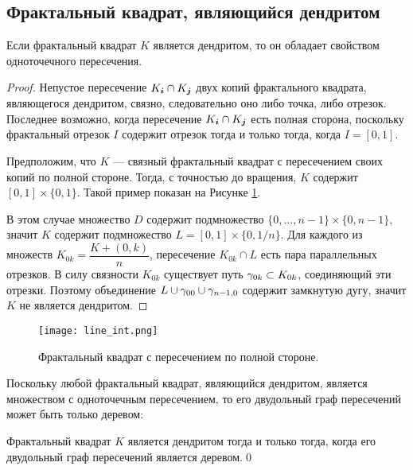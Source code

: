 \subsection{Фрактальный квадрат, являющийся дендритом}

\begin{proposition}
\label{thm:den_necessary_sufficient}
Если фрактальный квадрат $K$ является дендритом, то он обладает свойством одноточечного пересечения.
\end{proposition}

\begin{proof}
Непустое пересечение $K_{\bm{i}}\cap K_{\bm{j}}$ двух копий фрактального квадрата, являющегося дендритом, связно, следовательно оно либо точка, либо отрезок.
Последнее возможно, когда пересечение $K_{\bm{i}}\cap K_{\bm{j}}$ есть полная сторона, поскольку фрактальный отрезок $I$ содержит отрезок тогда и только тогда, когда $I=[0, 1]$. 

Предположим, что $K$ --- связный фрактальный квадрат с пересечением своих копий по полной стороне. 
Тогда, с точностью до вращения, $K$ содержит $[0,1]\times\{0,1\}$.
Такой пример показан на Рисунке \ref{fig:line_int}.

В этом случае множество $D$ содержит подмножество $ \{0,\ldots,n-1\}\times \{0,n-1\}$, значит $K$ содержит подмножество $L=[0,1]\times\{0,1/n\}$. 
Для каждого из множеств $K_{0k}=\dfrac{K+(0,k)}{n}$, пересечение $K_{0k}\cap L$ есть пара параллельных отрезков. 
В силу связности $K_{0k}$ существует путь $\gamma_{0k}\subset K_{0k}$, соединяющий эти  отрезки. 
Поэтому объединение $L\cup\gamma_{00}\cup\gamma_{n-1,0}$ содержит замкнутую дугу, значит $K$ не является дендритом. 
\end{proof}

\begin{figure}[H]
 \centering
 \texttt{[image: line\_int.png]}
 \caption{Фрактальный квадрат с пересечением по полной стороне.}
 \label{fig:line_int}
\end{figure}

Поскольку любой фрактальный квадрат, являющийся дендритом, является множеством с одноточечным пересечением, то его двудольный граф пересечений может быть только деревом:

\begin{corollary}\label{cor:fsden}
Фрактальный квадрат $K$ является дендритом тогда и только тогда, когда его двудольный граф пересечений является деревом.\hfill\qed
\end{corollary}



